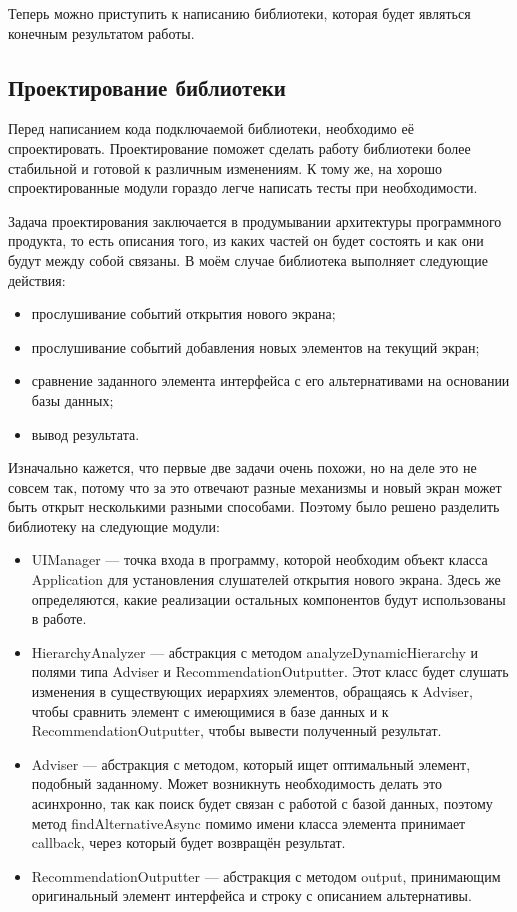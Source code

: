 \documentclass[a4paper,14pt]{extarticle} %
\begin{document}
	Теперь можно приступить к написанию библиотеки, которая будет являться конечным результатом работы.
	
	\subsection{Проектирование библиотеки}
	
	Перед написанием кода подключаемой библиотеки, необходимо её спроектировать. Проектирование поможет сделать работу библиотеки более стабильной и готовой к различным изменениям. К тому же, на хорошо спроектированные модули гораздо легче написать тесты при необходимости. 
	
	Задача проектирования заключается в продумывании архитектуры программного продукта, то есть описания того, из каких частей он будет состоять и как они будут между собой связаны. В моём случае библиотека выполняет следующие действия:
	\begin{itemize}
		\item прослушивание событий открытия нового экрана;
		\item прослушивание событий добавления новых элементов на текущий экран;
		\item сравнение заданного элемента интерфейса с его альтернативами на основании базы данных;
		\item вывод результата.
	\end{itemize}
	Изначально кажется, что первые две задачи очень похожи, но на деле это не совсем так, потому что за это отвечают разные механизмы и новый экран может быть открыт несколькими разными способами. Поэтому было решено разделить библиотеку на следующие модули:
	\begin{itemize}
		\item UIManager --- точка входа в программу, которой необходим объект класса Application для установления слушателей открытия нового экрана. Здесь же определяются, какие реализации остальных компонентов будут использованы в работе.
		\item HierarchyAnalyzer --- абстракция с методом analyzeDynamicHierarchy и полями типа Adviser и RecommendationOutputter. Этот класс будет слушать изменения в существующих иерархиях элементов, обращаясь к Adviser, чтобы сравнить элемент с имеющимися в базе данных и к RecommendationOutputter, чтобы вывести полученный результат.
		\item Adviser --- абстракция с методом, который ищет оптимальный элемент, подобный заданному. Может возникнуть необходимость делать это асинхронно, так как поиск будет связан с работой с базой данных, поэтому метод findAlternativeAsync помимо имени класса элемента принимает callback, через который будет возвращён результат.
		\item RecommendationOutputter --- абстракция с методом output, принимающим оригинальный элемент интерфейса и строку с описанием альтернативы.
	\end{itemize}
\end{document}

